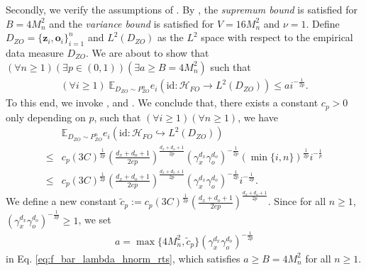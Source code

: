 \documentclass[11pt]{article}
\newcommand{\bz}{\mathbf z}
\newcommand{\bo}{\mathbf o}
\newcommand{\calH}{\mathcal{H}}
\newcommand{\0}{\mathbf{0}}
\begin{document}
\begin{appendix}
Secondly, we verify the assumptions of \citet[Theorem 7.23]{steinwart2008support}. By \citet[Example 7.3]{steinwart2008support}, the \emph{supremum bound} is satisfied for $B = 4M_n^2$ and the \emph{variance bound} is satisfied for $V = 16M_n^2$ and $\nu=1$. 
Define $D_{ZO}=\{\bz_i, \bo_i\}_{i=1}^n$ and $L^2(D_{ZO})$ as the $L^2$ space with respect to the empirical data measure $D_{ZO}$. 
We are about to show that $(\forall n\geq 1) (\exists p\in (0,1))(\exists a\geq B = 4M_n^2)$ such that 
\begin{align}
\label{eq:f_bar_lambda_hnorm_rts}
   (\forall i\geq 1)\; \mathbb{E}_{D_{ZO}\sim P_{ZO}^{n}}e_i(\mathrm{id}:\calH_{FO}\to L^2(D_{ZO}))\leq ai^{-\frac{1}{2p}}.
\end{align}
To this end, we invoke \citet[Corollary 7.31]{steinwart2008support},  and . We conclude that, there exists a constant $c_p>0$ only depending on $p$, such that $(\forall i\geq 1) (\forall n\geq 1)$, we have
\begin{align*}
    &\mathbb{E}_{D_{ZO}\sim P^n_{ZO}}e_i(\mathrm{id}:\calH_{FO}\hookrightarrow L^2(D_{ZO}))\\
    \leq & c_p(3C)^{\frac{1}{2p}}\left(\frac{d_x+d_o+1}{2ep}\right)^{\frac{d_x+d_o+1}{2p}}\left(\gamma_x^{d_x}\gamma_o^{d_o}\right)^{-\frac{1}{2p}}(\min\{i,n\})^{\frac{1}{2p}}i^{-\frac{1}{p}}\\
    \leq & c_p(3C)^{\frac{1}{2p}}\left(\frac{d_x+d_o+1}{2ep}\right)^{\frac{d_x+d_o+1}{2p}}\left(\gamma_x^{d_x}\gamma_o^{d_o}\right)^{-\frac{1}{2p}}i^{-\frac{1}{2p}}.
\end{align*}
We define a new constant $\tilde{c}_{p}:= c_p(3C)^{\frac{1}{2p}}\left(\frac{d_x+d_o+1}{2ep}\right)^{\frac{d_x+d_o+1}{2p}}$. Since for all $n\geq 1$, $\left(\gamma_x^{d_x}\gamma_o^{d_o}\right)^{-\frac{1}{2p}}\geq 1$, we set 
\begin{align*}
    a = \max\{4M_n^2, \tilde{c}_{p}\}\left(\gamma_x^{d_x}\gamma_o^{d_o}\right)^{-\frac{1}{2p}}
\end{align*}
in Eq. \eqref{eq:f_bar_lambda_hnorm_rts}, which satisfies $a \geq B = 4M_n^2$ for all $n\geq1$. 


\end{appendix}
\end{document}
